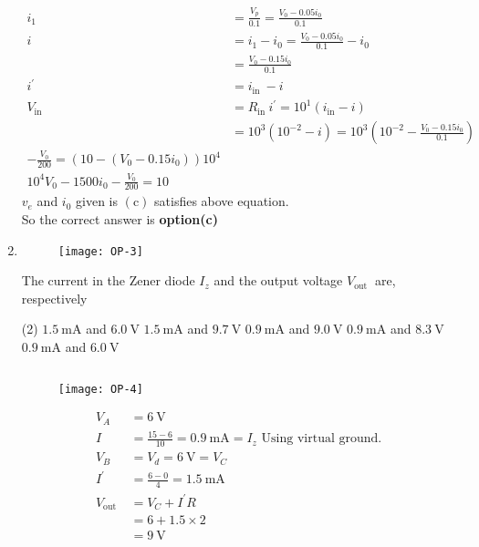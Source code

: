 \begin{enumerate}
\begin{answer}
\begin{align*}
	i_{1} &=\frac{V_{p}}{0.1}=\frac{V_{0}-0.05 i_{0}}{0.1} \\
	i &=i_{1}-i_{0}=\frac{V_{0}-0.05 i_{0}}{0.1}-i_{0} \\
	&=\frac{V_{0}-0.15 i_{0}}{0.1} \\
	i^{\prime} &=i_{\text {in }}-i \\
	V_{\text {in }} &=R_{\text {in }} i^{\prime}=10^{1}\left(i_{\mathrm{in}}-i\right) \\
	&=10^{3}\left(10^{-2}-i\right)=10^{3}\left(10^{-2}-\frac{V_{0}-0.15 i_{0}}{0.1}\right)\\
	-\frac{V_{0}}{200}=\left(10-\left(V_{0}-0.15 i_{0}\right)\right) 10^{4} \\
	10^{4} V_{0}-1500 i_{0}-\frac{V_{0}}{200}=10
	\end{align*}
	$v_{e}$ and $i_{0}$ given is $(\mathrm{c})$ satisfies above equation.\\
		So the correct answer is \textbf{option(c)}
\end{answer}
\item {}
\begin{figure}[H]
	\centering
	\texttt{[image: OP-3]}
\end{figure}
The current in the Zener diode $I_{z}$ and the output voltage $V_{\text {out }}$ are, respectively
 \begin{tasks}(2)
	\task[\textbf{a.}]$1.5 \mathrm{~mA}$ and $6.0 \mathrm{~V}$
	\task[\textbf{b.}]$1.5 \mathrm{~mA}$ and $9.7 \mathrm{~V}$
	\task[\textbf{c.}] $0.9 \mathrm{~mA}$ and $9.0 \mathrm{~V}$
	\task[\textbf{d.}] $0.9 \mathrm{~mA}$ and $8.3 \mathrm{~V}$
	\task[\textbf{e.}]$0.9 \mathrm{~mA}$ and $6.0 \mathrm{~V}$
\end{tasks}
\begin{answer}$\left. \right. $
	\begin{figure}[H]
		\centering
		\texttt{[image: OP-4]}
	\end{figure}
	\begin{align*}
	V_{A} &=6 \mathrm{~V} \\
	I &=\frac{15-6}{10}=0.9 \mathrm{~mA}=I_{z}
	\text { Using virtual ground. }\\
	V_{B}&=V_{d}=6 \mathrm{~V}=V_{C}\\
	I^{\prime} &=\frac{6-0}{4}=1.5 \mathrm{~mA} \\
	V_{\text {out }} &=V_{C}+I^{\prime} R \\
	&=6+1.5 \times 2 \\
	&=9 \mathrm{~V}
	\end{align*}
\end{answer}

\end{enumerate}